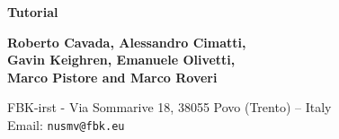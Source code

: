 \begin{titlepage}
\begin{center}
  \begin{Huge}
  {\bf \NuSMV Tutorial}\\
  \end{Huge}
  \vspace{0.5cm}
  \vspace{4.0cm}

  \begin{Large}
  {\bf Roberto Cavada, Alessandro Cimatti,\\ 
  Gavin Keighren, Emanuele Olivetti,\\
  Marco Pistore and Marco Roveri}
  \end{Large}

  \vspace{1cm}
  {FBK-irst - Via Sommarive 18, 38055 Povo (Trento) -- Italy}\\

  \vspace{1cm}
  Email: {\tt nusmv@fbk.eu}\\
  \vspace{4.0cm}
\end{center}
\vspace{1in}
\end{titlepage}
